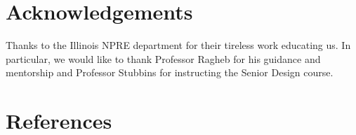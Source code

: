 \documentclass[12pt]{article}
\begin{document}

\section{Acknowledgements}
Thanks to the Illinois NPRE department for their tireless work educating us. In particular, we would like to thank Professor Ragheb for his guidance and mentorship and Professor Stubbins for instructing the Senior Design course.


\section{References}





\end{document}
